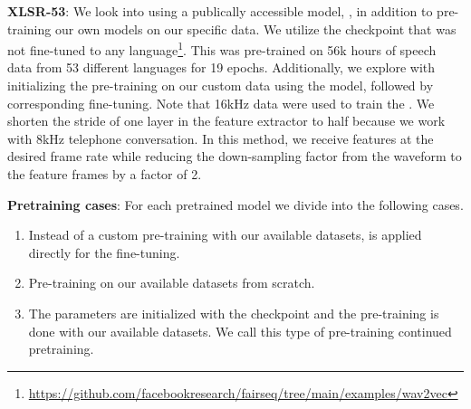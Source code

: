 \textbf{XLSR-53}: We look into using a publically accessible model,  \cite{xlsr53}, in addition to pre-training our own models on our specific data.
We utilize the checkpoint that was not fine-tuned to any language\footnote{\href{https://github.com/facebookresearch/fairseq/tree/main/examples/wav2vec}{https://github.com/facebookresearch/fairseq/tree/main/examples/wav2vec}}. 
This was pre-trained on 56k hours of speech data from 53 different languages for 19 epochs.
Additionally, we explore with initializing the  pre-training on our custom data using the  model, followed by corresponding fine-tuning.
Note that 16kHz data were used to train the . 
We shorten the stride of one  layer in the feature extractor to half because we work with 8kHz telephone conversation.
In this method, we receive features at the desired frame rate while reducing the down-sampling factor from the waveform to the feature frames by a factor of 2.

\textbf{Pretraining cases}: For each pretrained model we divide into the following cases. 
\begin{enumerate}
	\item Instead of a custom pre-training with our available datasets,  is applied directly for the fine-tuning.
	\item Pre-training on our available datasets from scratch.
	\item The parameters are initialized with the 
	 checkpoint and the pre-training is done with our available datasets.
	We call this type of pre-training continued pretraining.
\end{enumerate}

